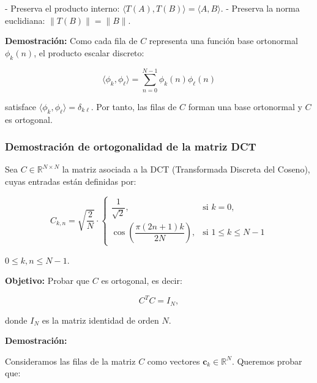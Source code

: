 \documentclass[8pt,a4paper]{article}
\theoremstyle{definition}
\theoremstyle{remark}
\begin{document}
\begin{multicols}{2}
            - Preserva el producto interno: \( \langle T(A), T(B) \rangle = \langle A, B \rangle \).
            - Preserva la norma euclidiana: \( \|T(B)\| = \|B\| \).
            
            \textbf{Demostración:} Como cada fila de \( C \) representa una función base ortonormal \( \phi_k(n) \), el producto escalar discreto:
            
            \[
            \langle \phi_k, \phi_\ell \rangle = \sum_{n=0}^{N-1} \phi_k(n) \phi_\ell(n)
            \]
            
            satisface \( \langle \phi_k, \phi_\ell \rangle = \delta_{k\ell} \). Por tanto, las filas de \( C \) forman una base ortonormal y \( C \) es ortogonal.
    
            \subsubsection{Demostración de ortogonalidad de la matriz DCT}
    
            Sea \( C \in \mathbb{R}^{N \times N} \) la matriz asociada a la DCT (Transformada Discreta del Coseno), cuyas entradas están definidas por:
            
            \[
            C_{k,n} =
            \sqrt{\frac{2}{N}} \cdot
            \begin{cases}
            \dfrac{1}{\sqrt{2}}, & \text{si } k = 0, \\
            \cos\left( \dfrac{\pi(2n + 1)k}{2N} \right), & \text{si } 1 \leq k \leq N-1
            \end{cases}
            \]
            
            \vspace{1em}
            
             \( 0 \leq k, n \leq N-1 \).
            
            \vspace{1em}
            
            \textbf{Objetivo:} Probar que \( C \) es ortogonal, es decir:

            
            \[
            C^T C = I_N,
            \]
            
            donde \( I_N \) es la matriz identidad de orden \( N \).
            
            \textbf{Demostración:}
            
            Consideramos las filas de la matriz \( C \) como vectores \( \mathbf{c}_k \in \mathbb{R}^N \). Queremos probar que:
            

\end{multicols}
\end{document}
